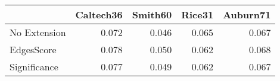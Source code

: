 \begin{tabular}{lrrrr}
\toprule
{} & Caltech36 & Smith60 & Rice31 & Auburn71 \\
\midrule
No Extension &     0.072 &   0.046 &  0.065 &    0.067 \\
EdgesScore   &     0.078 &   0.050 &  0.062 &    0.068 \\
Significance &     0.077 &   0.049 &  0.062 &    0.067 \\
\bottomrule
\end{tabular}
